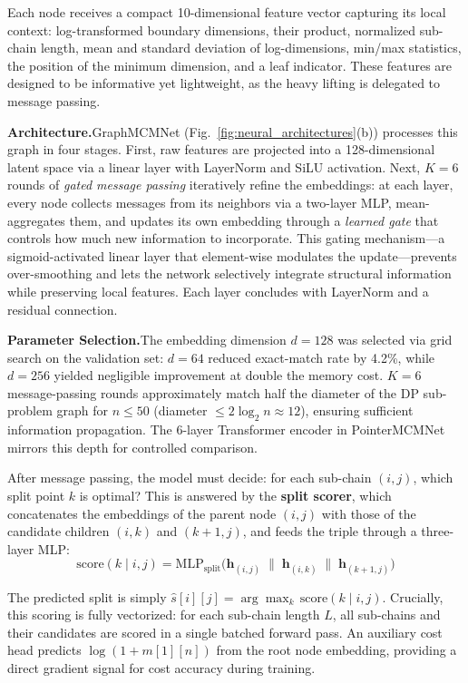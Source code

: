 \documentclass[conference]{IEEEtran}
\begin{document}
Each node receives a compact 10-dimensional feature vector capturing its local context: log-transformed boundary dimensions, their product, normalized sub-chain length, mean and standard deviation of log-dimensions, min/max statistics, the position of the minimum dimension, and a leaf indicator. These features are designed to be informative yet lightweight, as the heavy lifting is delegated to message passing.

\medskip
\noindent\textbf{Architecture.}\quad GraphMCMNet (Fig.~\ref{fig:neural_architectures}(b)) processes this graph in four stages. First, raw features are projected into a 128-dimensional latent space via a linear layer with LayerNorm and SiLU activation. Next, $K{=}6$ rounds of \emph{gated message passing} iteratively refine the embeddings: at each layer, every node collects messages from its neighbors via a two-layer MLP, mean-aggregates them, and updates its own embedding through a \emph{learned gate} that controls how much new information to incorporate. This gating mechanism---a sigmoid-activated linear layer that element-wise modulates the update---prevents over-smoothing and lets the network selectively integrate structural information while preserving local features. Each layer concludes with LayerNorm and a residual connection.

\medskip
\noindent\textbf{Parameter Selection.}\quad The embedding dimension $d{=}128$ was selected via grid search on the validation set: $d{=}64$ reduced exact-match rate by 4.2\%, while $d{=}256$ yielded negligible improvement at double the memory cost. $K{=}6$ message-passing rounds approximately match half the diameter of the DP sub-problem graph for $n{\le}50$ (diameter ${\le}2\log_2 n {\approx} 12$), ensuring sufficient information propagation. The 6-layer Transformer encoder in PointerMCMNet mirrors this depth for controlled comparison.

After message passing, the model must decide: for each sub-chain $(i,j)$, which split point $k$ is optimal? This is answered by the \textbf{split scorer}, which concatenates the embeddings of the parent node $(i,j)$ with those of the candidate children $(i,k)$ and $(k{+}1,j)$, and feeds the triple through a three-layer MLP:
\begin{equation}
\text{score}(k \mid i,j) = \text{MLP}_{\text{split}}\bigl(\mathbf{h}_{(i,j)} \;\|\; \mathbf{h}_{(i,k)} \;\|\; \mathbf{h}_{(k+1,j)}\bigr)
\label{eq:split_score}
\end{equation}

The predicted split is simply $\hat{s}[i][j] = \arg\max_k \, \text{score}(k \mid i,j)$. Crucially, this scoring is fully vectorized: for each sub-chain length $L$, all sub-chains and their candidates are scored in a single batched forward pass. An auxiliary cost head predicts $\log(1{+}m[1][n])$ from the root node embedding, providing a direct gradient signal for cost accuracy during training.
\end{document}

